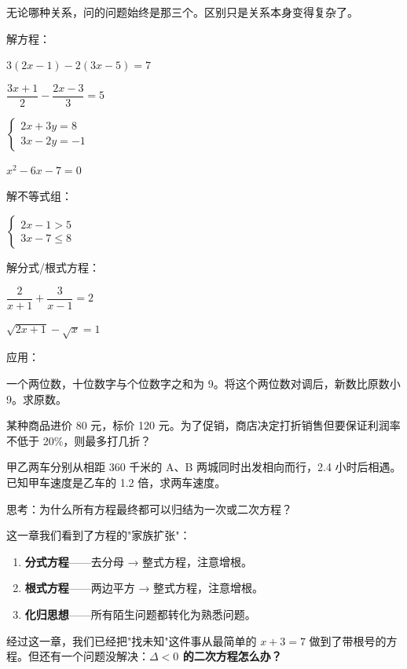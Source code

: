 无论哪种关系，问的问题始终是那三个。区别只是关系本身变得复杂了。

\begin{exercise}
\item 解方程：
  \begin{subexercise}
    \item $3(2x-1)-2(3x-5)=7$
    \item $\dfrac{3x+1}{2} - \dfrac{2x-3}{3} = 5$
    \item $\begin{cases}2x+3y=8\\3x-2y=-1\end{cases}$
    \item $x^2 - 6x - 7 = 0$
  \end{subexercise}

\item 解不等式组：
  \begin{subexercise}
    \item $\begin{cases}2x-1>5\\3x-7\le 8\end{cases}$
  \end{subexercise}

\item 解分式/根式方程：
  \begin{subexercise}
    \item $\dfrac{2}{x+1} + \dfrac{3}{x-1} = 2$
    \item $\sqrt{2x+1} - \sqrt{x} = 1$
  \end{subexercise}

\item 应用：
  \begin{subexercise}
    \item 一个两位数，十位数字与个位数字之和为 9。将这个两位数对调后，新数比原数小 9。求原数。
    \item 某种商品进价 80 元，标价 120 元。为了促销，商店决定打折销售但要保证利润率不低于 20\%，则最多打几折？
    \item 甲乙两车分别从相距 360 千米的 A、B 两城同时出发相向而行，2.4 小时后相遇。已知甲车速度是乙车的 1.2 倍，求两车速度。
  \end{subexercise}

\item 思考：为什么所有方程最终都可以归结为一次或二次方程？
\end{exercise}


这一章我们看到了方程的"家族扩张"：

\begin{enumerate}
  \item \textbf{分式方程}——去分母 → 整式方程，注意增根。
  \item \textbf{根式方程}——两边平方 → 整式方程，注意增根。
  \item \textbf{化归思想}——所有陌生问题都转化为熟悉问题。
\end{enumerate}

经过这一章，我们已经把"找未知"这件事从最简单的 $x+3=7$ 做到了带根号的方程。但还有一个问题没解决：\textbf{$\Delta<0$ 的二次方程怎么办？}

